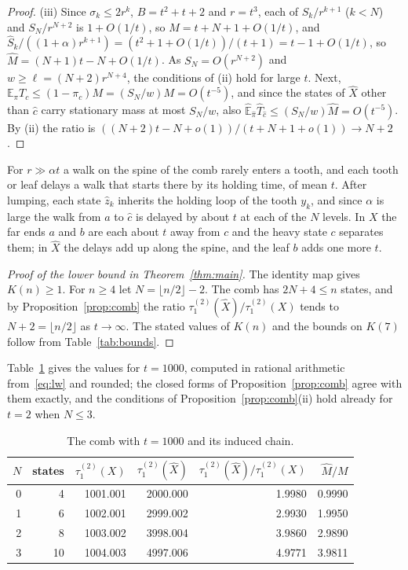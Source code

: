 \documentclass[11pt]{amsart}
\theoremstyle{definition}
\newcommand{\E}{\mathbb{E}}
\newcommand{\tmix}{\tau_1^{(2)}}
\newcommand{\hE}{\widehat{\E}}
\newcommand{\hpi}{\widehat{\pi}}
\newcommand{\hX}{\widehat{X}}
\newcommand{\hM}{\widehat{M}}
\newcommand{\hS}{\widehat{S}}
\begin{document}
\begin{proof}
(iii) Since $\sigma_k\le2r^k$, $B=t^2+t+2$ and $r=t^3$, each of $S_k/r^{k+1}$ ($k<N$) and $S_N/r^{N+2}$ is
$1+O(1/t)$, so $M=t+N+1+O(1/t)$, and $\hS_k/((1+\alpha)r^{k+1})=(t^2+1+O(1/t))/(t+1)=t-1+O(1/t)$, so
$\hM=(N+1)t-N+O(1/t)$. As $S_N=O(r^{N+2})$ and $w\ge\ell=(N+2)r^{N+4}$, the conditions of (ii) hold for large $t$.
Next, $\E_\pi T_c\le(1-\pi_c)M=(S_N/w)M=O(t^{-5})$, and since the states of $\hX$ other than $\hat c$ carry
stationary mass at most $S_N/w$, also $\hE_{\hpi}\widehat T_{\hat c}\le(S_N/w)\hM=O(t^{-5})$. By (ii) the ratio is
$((N+2)t-N+o(1))/(t+N+1+o(1))\to N+2$.
\end{proof}

For $r\gg\alpha t$ a walk on the spine of the comb rarely enters a tooth, and each tooth or leaf delays a walk that
starts there by its holding time, of mean $t$. After lumping, each state $\hat z_k$ inherits the holding loop of the
tooth $y_k$, and since $\alpha$ is large the walk from $a$ to $\hat c$ is delayed by about $t$ at each of the $N$
levels. In $X$ the far ends $a$ and $b$ are each about $t$ away from $c$ and the heavy state $c$ separates them; in
$\hX$ the delays add up along the spine, and the leaf $b$ adds one more $t$.

\begin{proof}[Proof of the lower bound in Theorem~\ref{thm:main}]
The identity map gives $K(n)\ge1$. For $n\ge4$ let $N=\lfloor n/2\rfloor-2$. The comb has $2N+4\le n$ states, and by
Proposition~\ref{prop:comb} the ratio $\tmix(\hX)/\tmix(X)$ tends to $N+2=\lfloor n/2\rfloor$ as $t\to\infty$. The
stated values of $K(n)$ and the bounds on $K(7)$ follow from Table~\ref{tab:bounds}.
\end{proof}

Table~\ref{tab:comb} gives the values for $t=1000$, computed in rational arithmetic from~\eqref{eq:lw} and rounded;
the closed forms of Proposition~\ref{prop:comb} agree with them exactly, and the conditions of
Proposition~\ref{prop:comb}(ii) hold already for $t=2$ when $N\le3$.

\begin{table}[tbp]
\centering
\begin{tabular}{rrrrrr}
\toprule
$N$ & states & $\tmix(X)$ & $\tmix(\hX)$ & $\tmix(\hX)/\tmix(X)$ & $\hM/M$\\
\midrule
0 & 4 & 1001.001 & 2000.000 & 1.9980 & 0.9990\\
1 & 6 & 1002.001 & 2999.002 & 2.9930 & 1.9950\\
2 & 8 & 1003.002 & 3998.004 & 3.9860 & 2.9890\\
3 & 10 & 1004.003 & 4997.006 & 4.9771 & 3.9811\\
\bottomrule
\end{tabular}
\caption{The comb with $t=1000$ and its induced chain.}\label{tab:comb}
\end{table}
\end{document}
